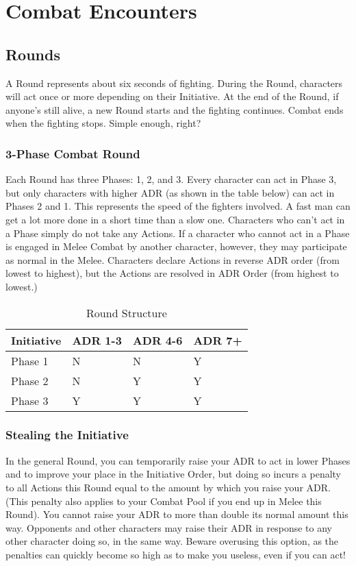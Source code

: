 \documentclass[oneside,11pt,english]{book}
\begin{document}
\section{Combat Encounters}
\subsection{Rounds}
A Round represents about six seconds of fighting. During the Round, characters will act once or more
depending on their Initiative. At the end of the Round, if anyone’s still alive, a new Round starts and the
fighting continues. Combat ends when the fighting stops. Simple enough, right?
\subsubsection{3-Phase Combat Round}
Each Round has three Phases: 1, 2, and 3. Every character can act in Phase 3, but only characters with
higher ADR (as shown in the table below) can act in Phases 2 and 1. This represents the speed of the
fighters involved. A fast man can get a lot more done in a short time than a slow one. Characters who
can’t act in a Phase simply do not take any Actions. If a character who cannot act in a Phase is engaged in
Melee Combat by another character, however, they may participate as normal in the Melee.
Characters declare Actions in reverse ADR order (from lowest to highest), but the Actions are resolved in ADR Order (from highest to lowest.)
\begin{table}[!hb]
  \centering
  \caption{Round Structure}
  \label{tab:Round Structure}
  \begin{tabu} spread 0pt {X[2,l] *{3}{X}}
    Initiative&ADR 1-3&ADR 4-6&ADR 7+\\\toprule
    Phase 1&  	N  &	N & 	Y\\
    Phase 2&  	N  &	Y & 	Y\\
    Phase 3&  	Y  &	Y & 	Y\\
  \end{tabu}
\end{table}
\subsubsection{Stealing the Initiative}
In the general Round, you can temporarily raise your ADR to act in lower Phases and to improve your
place in the Initiative Order, but doing so incurs a penalty to all Actions this Round equal to the amount
by which you raise your ADR. (This penalty also applies to your Combat Pool if you end up in Melee this
Round). You cannot raise your ADR to more than double its normal amount this way. Opponents and
other characters may raise their ADR in response to any other character doing so, in the same way.
Beware overusing this option, as the penalties can quickly become so high as to make you useless, even if
you can act!
\end{document}
